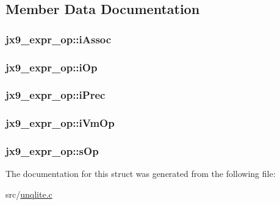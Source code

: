 \subsection{Member Data Documentation}
\hypertarget{structjx9__expr__op_ace452d5263e0e93220b8b7a5e535a6ee}{
\subsubsection[{i\-Assoc}]{ jx9\-\_\-expr\-\_\-op\-::i\-Assoc}}\label{df/d8d/structjx9__expr__op_ace452d5263e0e93220b8b7a5e535a6ee}
\hypertarget{structjx9__expr__op_a0f55fa42afc89e69299983e26b709aa5}{
\subsubsection[{i\-Op}]{ jx9\-\_\-expr\-\_\-op\-::i\-Op}}\label{df/d8d/structjx9__expr__op_a0f55fa42afc89e69299983e26b709aa5}
\hypertarget{structjx9__expr__op_af398985e17e482e76a7ab41a4d4428a4}{
\subsubsection[{i\-Prec}]{ jx9\-\_\-expr\-\_\-op\-::i\-Prec}}\label{df/d8d/structjx9__expr__op_af398985e17e482e76a7ab41a4d4428a4}
\hypertarget{structjx9__expr__op_a99154bc7454f19103498a99f5a810ace}{
\subsubsection[{i\-Vm\-Op}]{ jx9\-\_\-expr\-\_\-op\-::i\-Vm\-Op}}\label{df/d8d/structjx9__expr__op_a99154bc7454f19103498a99f5a810ace}
\hypertarget{structjx9__expr__op_ad8619d416929a84273ef46003660f483}{
\subsubsection[{s\-Op}]{ jx9\-\_\-expr\-\_\-op\-::s\-Op}}\label{df/d8d/structjx9__expr__op_ad8619d416929a84273ef46003660f483}


The documentation for this struct was generated from the following file\-:\begin{DoxyCompactItemize}
\item 
src/\hyperlink{unqlite_8c}{unqlite.\-c}\end{DoxyCompactItemize}
